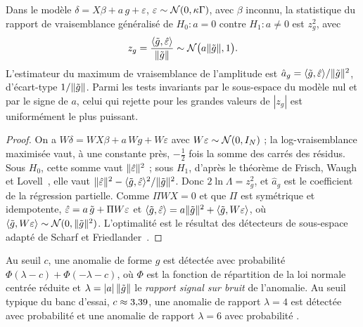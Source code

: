 \begin{theorem}\label{thm-glrt}
Dans le modèle $\delta=X\beta+a\,g+\varepsilon$, $\varepsilon\sim\mathcal{N}(0, \kappa\Gamma)$, avec $\beta$ inconnu, la
statistique du rapport de vraisemblance généralisé de $H_0:a=0$ contre $H_1:a\ne0$ est $z_g^2$, avec
\begin{equation}\label{eq-z}
z_g=\frac{\langle \tilde g, \hat\varepsilon\rangle}{\lVert \tilde g\rVert}\sim\mathcal{N}\bigl(a\lVert \tilde g\rVert, 1\bigr).
\end{equation}
L'estimateur du maximum de vraisemblance de l'amplitude est $\hat a_g=\langle \tilde g, \hat\varepsilon\rangle/\lVert \tilde g\rVert^2$, d'écart-type
$1/\lVert \tilde g\rVert$. Parmi les tests invariants par le sous-espace du modèle nul et par le signe de $a$, celui qui rejette
pour les grandes valeurs de $|z_g|$ est uniformément le plus puissant.
\end{theorem}
\begin{proof}
On a $W\delta=WX\beta+a\,Wg+W\varepsilon$ avec $W\varepsilon\sim\mathcal{N}(0, I_N)$ ; la log-vraisemblance maximisée vaut, à une
constante près, $-\tfrac12$ fois la somme des carrés des résidus. Sous $H_0$, cette somme vaut $\lVert \hat\varepsilon\rVert^2$ ; sous
$H_1$, d'après le théorème de Frisch, Waugh et Lovell~\cite{lovell1963}, elle vaut
$\lVert \hat\varepsilon\rVert^2-\langle \tilde g, \hat\varepsilon\rangle^2/\lVert \tilde g\rVert^2$. Donc $2\ln\Lambda=z_g^2$, et $\hat a_g$ est le coefficient de la
régression partielle. Comme $\Pi WX=0$ et que $\Pi$ est symétrique et idempotente,
$\hat\varepsilon=a\,\tilde g+\Pi W\varepsilon$ et $\langle \tilde g, \hat\varepsilon\rangle=a\lVert \tilde g\rVert^2+\langle \tilde g, W\varepsilon\rangle$, où
$\langle \tilde g, W\varepsilon\rangle\sim\mathcal{N}(0, \lVert \tilde g\rVert^2)$. L'optimalité est le résultat des détecteurs de sous-espace adapté de
Scharf et Friedlander~\cite{scharf1994}.
\end{proof}

\begin{corollary}[Puissance]\label{cor-power}
Au seuil $c$, une anomalie de forme $g$ est détectée avec probabilité $\Phi(\lambda-c)+\Phi(-\lambda-c)$, où $\Phi$ est
la fonction de répartition de la loi normale centrée réduite et $\lambda=|a|\,\lVert \tilde g\rVert$ le \emph{rapport signal sur
bruit} de l'anomalie. Au seuil typique du banc d'essai, $c\approx\num{3.39}$, une anomalie de rapport $\lambda=4$ est
détectée avec probabilité \vPowThFour{} et une anomalie de rapport $\lambda=6$ avec probabilité \vPowThSix.
\end{corollary}

